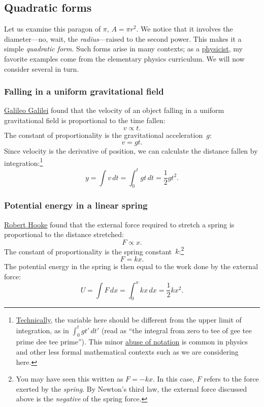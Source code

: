   \subsection{Quadratic forms} %
  \label{sec:quadratic_forms}

Let us examine this paragon of $\pi$, $A = \pi r^2$. We notice that it involves the diameter---no, wait, the \emph{radius}---raised to the second power. This makes it a simple \emph{quadratic form}. Such forms arise in many contexts; as a \href{http://thesis.library.caltech.edu/1940/}{physicist}, my favorite examples come from the elementary physics curriculum. We will now consider several in turn.

    \subsubsection{Falling in a uniform gravitational field} %
    \label{sec:falling_in_a_uniform_gravitational_field}

\href{https://en.wikipedia.org/wiki/Galileo_Galilei}{Galileo Galilei} found that the velocity of an object falling in a uniform gravitational field is proportional to the time fallen:
\[ v \propto t. \]
The constant of proportionality is the gravitational acceleration~$g$:
\[ v = g t. \]
Since velocity is the derivative of position, we can calculate the distance fallen by integration:\footnote{\href{https://xkcd.com/1475/}{Technically}, the variable here should be different from the upper limit of integration, as in $\int_0^t gt'\,dt'$ (read as ``the integral from zero to tee of gee tee prime dee tee prime''). This minor \href{https://en.wikipedia.org/wiki/Abuse_of_notation}{abuse of notation} is common in physics and other less formal mathematical contexts such as we are considering here.}
\[ y = \int v\,dt = \int_0^t gt\,dt = \textstyle{\frac{1}{2}} gt^2. \]


    \subsubsection{Potential energy in a linear spring} %
    \label{sec:potential_energy_in_a_linear_spring}

\href{https://en.wikipedia.org/wiki/Robert_Hooke}{Robert Hooke} found that the external force required to stretch a spring is proportional to the distance stretched:
\[ F \propto x. \]
The constant of proportionality is the spring constant~$k$:\footnote{You may have seen this written as $F = -kx$. In this case, $F$ refers to the force exerted by the \emph{spring}. By Newton's third law, the external force discussed above is the \emph{negative} of the spring force.}
\[ F = k x. \]
The potential energy in the spring is then equal to the work done by the external force:
\[ U = \int F\,dx = \int_0^x kx\,dx = \textstyle{\frac{1}{2}} kx^2. \]

